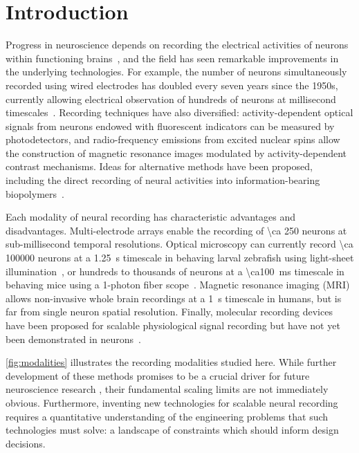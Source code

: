 \section{Introduction}
Progress in neuroscience depends on recording the electrical activities of neurons within functioning brains~\cite{alivisatos2012brain, bansal2012decoding}, and  the field has seen remarkable improvements in the underlying technologies. For example, the number of neurons simultaneously recorded using wired electrodes has doubled every seven years since the 1950s, currently allowing electrical observation of hundreds of neurons at millisecond timescales~\cite{stevenson11}. Recording techniques have also diversified: activity-dependent optical signals from neurons endowed with fluorescent indicators can be measured by photodetectors, and radio-frequency emissions from excited nuclear spins allow the construction of magnetic resonance images modulated by activity-dependent contrast mechanisms.
Ideas for alternative methods have been proposed, including the direct recording of neural activities into information-bearing biopolymers~\cite{zamft12,glaser13,kording11a}.

Each modality of neural recording has characteristic advantages and disadvantages.
Multi-electrode arrays enable the recording of \num{\ca 250} neurons at sub-millisecond temporal resolutions.
Optical microscopy can currently record \num{\ca 100000} neurons at a \SI{1.25}{\second} timescale in behaving larval zebrafish using light-sheet illumination~\cite{ahrens13}, or hundreds to thousands of neurons at a \SI{\ca100}{\milli\second} timescale in behaving mice using a 1-photon fiber scope~\cite{ziv13}.
Magnetic resonance imaging (MRI) allows non-invasive whole brain recordings at a \SI{1}{\second} timescale in humans, but is far from single neuron spatial resolution.
Finally, molecular recording devices have been proposed for scalable physiological signal recording but have not yet been demonstrated in neurons~\cite{zamft12,glaser13,kording11a}.

\autoref{fig:modalities} illustrates the recording modalities studied here.
While further development of these methods promises to be a crucial driver for future neuroscience research \cite{NeuroscienceThinksBigAndCollaboratively}, their fundamental scaling limits are not immediately obvious. Furthermore, inventing new technologies for scalable neural recording requires a quantitative understanding of the engineering problems that such technologies must solve: a landscape of constraints which should inform design decisions.

